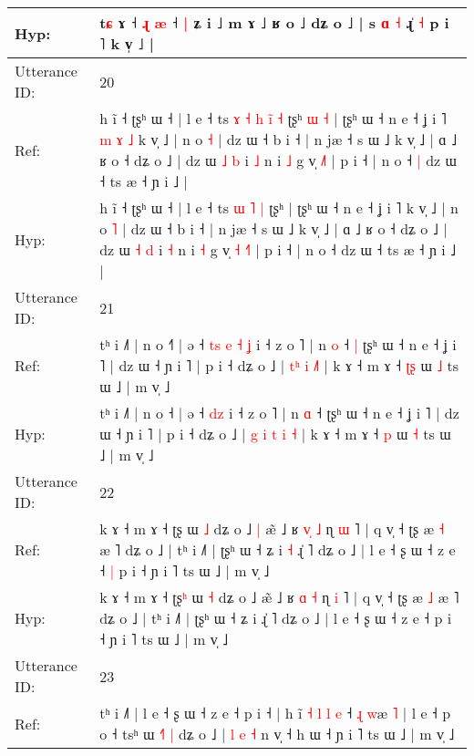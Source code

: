 \documentclass[10pt]{article}
\DeclareRobustCommand{\hl}[1]{{\textcolor{red}{#1}}}
\begin{document}
\begin{longtable}{ll}
Hyp: & t\hl{ɕ} ɤ ˧ \hl{ɻ} \hl{æ} ˧\hl{ }\hl{|} ʑ i ˩ m ɤ ˩ ʁ o ˩ dʑ o ˩ | s \hl{ɑ} \hl{˧} ɻ̍ \hl{˧} p i ˥ k v̩ ˩ |
 \\
\midrule
Utterance ID: & 20 \\
Ref: & h ĩ ˧ ʈʂʰ ɯ ˧ | l e ˧ ts\hl{ }\hl{ɤ}\hl{ }\hl{˧} \hl{h} \hl{i}\hl{̃} \hl{˧} ʈʂʰ\hl{ }\hl{ɯ}\hl{ }\hl{˧} | ʈʂʰ ɯ ˧ n e ˧ ʝ i ˥\hl{ }\hl{m}\hl{ }\hl{ɤ}\hl{ }\hl{˩} k v̩ ˩ | n o \hl{˧} | dz ɯ ˧ b i ˧ | n jæ ˧ s ɯ ˩ k v̩ ˩ | ɑ ˩ ʁ o ˧ dʑ o ˩ | dz ɯ \hl{˩} \hl{b} i \hl{˩} n i \hl{˩} g v̩\hl{}\hl{} \hl{˩}˥ | p i ˧ | n o ˧\hl{ }\hl{|} dz ɯ ˧ ts æ ˧ ɲ i ˩ |
 \\
Hyp: & h ĩ ˧ ʈʂʰ ɯ ˧ | l e ˧ ts\hl{}\hl{}\hl{}\hl{} \hl{ɯ} \hl{}\hl{˥} \hl{|} ʈʂʰ\hl{}\hl{}\hl{}\hl{} | ʈʂʰ ɯ ˧ n e ˧ ʝ i ˥\hl{}\hl{}\hl{}\hl{}\hl{}\hl{} k v̩ ˩ | n o \hl{˥} | dz ɯ ˧ b i ˧ | n jæ ˧ s ɯ ˩ k v̩ ˩ | ɑ ˩ ʁ o ˧ dʑ o ˩ | dz ɯ \hl{˧} \hl{d} i \hl{˧} n i \hl{˧} g v̩\hl{ }\hl{˧} \hl{˧}˥ | p i ˧ | n o ˧\hl{}\hl{} dz ɯ ˧ ts æ ˧ ɲ i ˩ |
 \\
\midrule
Utterance ID: & 21 \\
Ref: & tʰ i ˩˥ | n o ˧\hl{˥} | ə ˧\hl{ }\hl{t}\hl{s}\hl{ }\hl{e} \hl{˧}\hl{ }\hl{ʝ} i ˧ z o ˥ | n \hl{o} ˧\hl{ }\hl{|} ʈʂʰ ɯ ˧ n e ˧ ʝ i ˥ | dz ɯ ˧ ɲ i ˥ | p i ˧ dʑ o ˩ | \hl{}\hl{t}\hl{ʰ} \hl{i} \hl{}\hl{˩}\hl{˥} | k ɤ ˧ m ɤ ˧ \hl{ʈ}\hl{ʂ} ɯ \hl{˩} ts ɯ ˩ | m v̩ ˩
 \\
Hyp: & tʰ i ˩˥ | n o ˧\hl{} | ə ˧\hl{}\hl{}\hl{}\hl{}\hl{} \hl{}\hl{d}\hl{z} i ˧ z o ˥ | n \hl{ɑ} ˧\hl{}\hl{} ʈʂʰ ɯ ˧ n e ˧ ʝ i ˥ | dz ɯ ˧ ɲ i ˥ | p i ˧ dʑ o ˩ | \hl{g}\hl{ }\hl{i} \hl{t} \hl{i}\hl{ }\hl{˧} | k ɤ ˧ m ɤ ˧ \hl{}\hl{p} ɯ \hl{˧} ts ɯ ˩ | m v̩ ˩
 \\
\midrule
Utterance ID: & 22 \\
Ref: & k ɤ ˧ m ɤ ˧ ʈʂ\hl{} ɯ \hl{˩} dʑ o ˩\hl{ }\hl{|} æ̃ ˩ ʁ \hl{v}\hl{̩} \hl{˩} ɳ \hl{ɯ} ˥ | q v̩ ˧ ʈʂ æ \hl{˧} æ ˥ dʑ o ˩ | tʰ i ˩˥ | ʈʂʰ ɯ ˧ ʑ i\hl{ }\hl{˧} ɻ̍ ˥ dʑ o ˩ | l e ˧ ʂ ɯ ˧ z e ˧\hl{ }\hl{|} p i ˧ ɲ i ˥ ts ɯ ˩ | m v̩ ˩
 \\
Hyp: & k ɤ ˧ m ɤ ˧ ʈʂ\hl{ʰ} ɯ \hl{˧} dʑ o ˩\hl{}\hl{} æ̃ ˩ ʁ \hl{}\hl{ɑ} \hl{˧} ɳ \hl{i} ˥ | q v̩ ˧ ʈʂ æ \hl{˩} æ ˥ dʑ o ˩ | tʰ i ˩˥ | ʈʂʰ ɯ ˧ ʑ i\hl{}\hl{} ɻ̍ ˥ dʑ o ˩ | l e ˧ ʂ ɯ ˧ z e ˧\hl{}\hl{} p i ˧ ɲ i ˥ ts ɯ ˩ | m v̩ ˩
 \\
\midrule
Utterance ID: & 23 \\
Ref: & tʰ i ˩˥ | l e ˧ ʂ ɯ ˧ z e ˧ p i ˧ | h ĩ\hl{ }\hl{˧}\hl{ }\hl{l}\hl{ }\hl{l}\hl{ }\hl{e} ˧ \hl{ɻ} \hl{w}æ \hl{˥} | l e ˧ p o ˧ tsʰ ɯ \hl{˧}˥\hl{ }\hl{|} dʑ o ˩ |\hl{}\hl{}\hl{} \hl{l} \hl{}\hl{e} \hl{˧} n v̩ ˧ h ɯ ˧ ɲ i ˥ ts ɯ ˩ | m v̩ ˩\hl{}\hl{}

\end{longtable}
\end{document}
